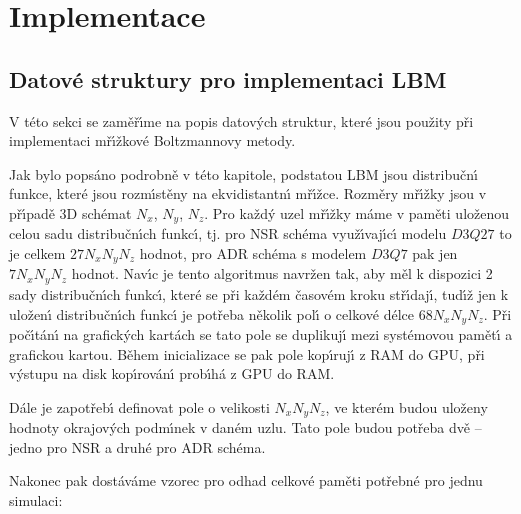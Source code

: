 
\chapter{Implementace}
\label{chap:Imp}

\pagestyle{plain}
  
    \section{Datov\'{e} struktury pro implementaci LBM}
    \label{sec:MPI}

        V t\'{e}to sekci se zam\v{e}\v{r}\'{\i}me na popis datov\'{y}ch struktur, kter\'{e} jsou pou\v{z}ity p\v{r}i implementaci m\v{r}\'{\i}\v{z}kov\'{e} Boltzmannovy metody. 

        Jak bylo pops\'{a}no podrobn\v{e} v t\'{e}to kapitole, podstatou LBM jsou distribu\v{c}n\'{\i} funkce, kter\'{e} jsou rozm\'{\i}st\v{e}ny na ekvidistantn\'{\i} m\v{r}\'{\i}\v{z}ce. Rozm\v{e}ry m\v{r}\'{\i}\v{z}ky jsou v p\v{r}\'{\i}pad\v{e} 3D sch\'{e}mat $N_x$, $N_y$, $N_z$. Pro ka\v{z}d\'{y} uzel m\v{r}\'{\i}\v{z}ky m\'{a}me v pam\v{e}ti ulo\v{z}enou celou sadu distribu\v{c}n\'{\i}ch funkc\'{\i}, tj. pro NSR sch\'{e}ma vyu\v{z}\'{\i}vaj\'{\i}c\'{\i} modelu $D3Q27$ to je celkem $27 N_x N_y N_z$ hodnot, pro ADR sch\'{e}ma s modelem $D3Q7$ pak jen $7 N_x N_y N_z$ hodnot.
        Nav\'{\i}c je tento algoritmus navr\v{z}en tak, aby m\v{e}l k dispozici 2 sady distribu\v{c}n\'{\i}ch funkc\'{\i}, kter\'{e} se p\v{r}i ka\v{z}d\'{e}m \v{c}asov\'{e}m kroku st\v{r}\'{\i}daj\'{\i}, tud\'{\i}\v{z} jen k ulo\v{z}en\'{\i} distribu\v{c}n\'{\i}ch funkc\'{\i} je pot\v{r}eba n\v{e}kolik pol\'{\i} o celkov\'{e} d\'{e}lce $68 N_x N_y N_z$. P\v{r}i po\v{c}\'{\i}t\'{a}n\'{\i} na grafick\'{y}ch kart\'{a}ch se tato pole se duplikuj\'{\i} mezi syst\'{e}movou pam\v{e}t\'{\i} a grafickou kartou. B\v{e}hem inicializace se pak pole kop\'{\i}ruj\'{\i} z RAM do GPU, p\v{r}i v\'{y}stupu na disk kop\'{\i}rov\'{a}n\'{\i} prob\'{\i}h\'{a} z GPU do RAM.

        D\'{a}le je zapot\v{r}eb\'{\i} definovat pole o velikosti $N_x N_y N_z$, ve kter\'{e}m budou ulo\v{z}eny hodnoty okrajov\'{y}ch podm\'{\i}nek v dan\'{e}m uzlu. Tato pole budou pot\v{r}eba dv\v{e} -- jedno pro NSR a druh\'{e} pro ADR sch\'{e}ma.

        Nakonec pak dost\'{a}v\'{a}me vzorec pro odhad celkov\'{e} pam\v{e}ti pot\v{r}ebn\'{e} pro jednu simulaci:
        
